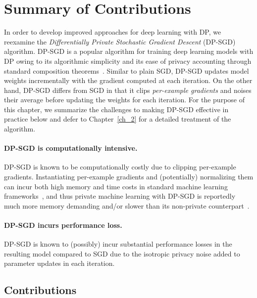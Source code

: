 \section{Summary of Contributions}\label{sec:overview_of_results}

In order to develop improved approaches for deep learning with DP, we reexamine the \emph{Differentially Private Stochastic Gradient Descent} (DP-SGD) algorithm.
DP-SGD is a popular algorithm for training deep learning models with DP owing to its algorithmic simplicity and its ease of privacy accounting through standard composition theorems~\cite{dwork2014algorithmic}.
Similar to plain SGD, DP-SGD updates model weights incrementally with the gradient computed at each iteration.
On the other hand, DP-SGD differs from SGD in that it clips \emph{per-example gradients} and noises their average before updating the weights for each iteration. 
For the purpose of this chapter, we summarize the challenges to making DP-SGD effective in practice below and defer to Chapter~\ref{ch_2} for a detailed treatment of the algorithm. 

\paragraph{DP-SGD is computationally intensive.} DP-SGD is known to be computationally costly due to clipping per-example gradients.
Instantiating per-example gradients and (potentially) normalizing them can incur both high memory and time costs in standard machine learning frameworks~\citep{paszke2019pytorch,frostig2018compiling}, and thus private machine learning with DP-SGD is reportedly much more memory demanding and/or slower than its non-private counterpart~\citep{carlini2019secret,hoory2021learning}. 

\paragraph{DP-SGD incurs performance loss.}
DP-SGD is known to (possibly) incur substantial performance losses in the resulting model compared to SGD due to the isotropic privacy noise added to parameter updates in each iteration.\\

\subsection{Contributions}

